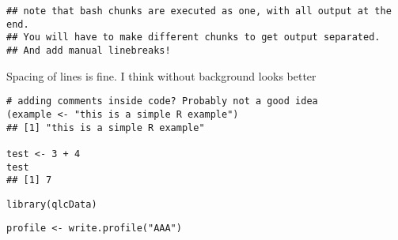 \documentclass[output=inprep,
		biblatex
		]{LSP/langsci}\usepackage[]{graphicx}\usepackage[]{color}
\makeatletter
\newenvironment{kframe}{%
 \def\at@end@of@kframe{}%
 \ifinner\ifhmode%
  \def\at@end@of@kframe{\end{minipage}}%
  \begin{minipage}{\columnwidth}%
 \fi\fi%
 \def\FrameCommand##1{\hskip\@totalleftmargin \hskip-\fboxsep
 \colorbox{shadecolor}{##1}\hskip-\fboxsep
     \hskip-\linewidth \hskip-\@totalleftmargin \hskip\columnwidth}%
 \MakeFramed {\advance\hsize-\width
   \@totalleftmargin\z@ \linewidth\hsize
   \@setminipage}}%
 {\par\unskip\endMakeFramed%
 \at@end@of@kframe}
\newenvironment{knitrout}{}{} %
\makeatother
\begin{document}
\begin{knitrout}\scriptsize
{}\color{fgcolor}\begin{kframe}
\begin{verbatim}
## note that bash chunks are executed as one, with all output at the end.
## You will have to make different chunks to get output separated.
## And add manual linebreaks!
\end{verbatim}
\end{kframe}
\end{knitrout}

Spacing of lines is fine. I think without background looks better

\begin{knitrout}\scriptsize
{}\color{fgcolor}\begin{kframe}
\begin{verbatim}
# adding comments inside code? Probably not a good idea
(example <- "this is a simple R example")
## [1] "this is a simple R example"

test <- 3 + 4
test
## [1] 7
\end{verbatim}
\end{kframe}
\end{knitrout}

\begin{knitrout}\scriptsize
{}\color{fgcolor}\begin{kframe}
\begin{verbatim}
library(qlcData)
\end{verbatim}


{\ttfamily\noindent\bfseries\color{errorcolor}{\#\# Error in library(qlcData): there is no package called 'qlcData'}}\begin{verbatim}
profile <- write.profile("AΑА")
\end{verbatim}


{\ttfamily\noindent\bfseries{}}\end{kframe}
\end{knitrout}

\begin{kframe}


{\ttfamily\noindent\bfseries{}}\end{kframe}
\end{document}
